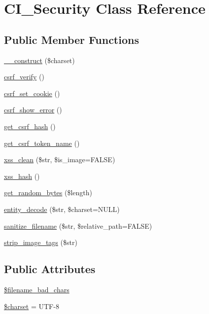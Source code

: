 \hypertarget{class_c_i___security}{}\section{C\+I\+\_\+\+Security Class Reference}
\label{class_c_i___security}
\subsection*{Public Member Functions}
\begin{DoxyCompactItemize}
\item 
\mbox{\hyperlink{class_c_i___security_aeee5dda3eeba2574642a18f281a4832c}{\+\_\+\+\_\+construct}} (\$charset)
\item 
\mbox{\hyperlink{class_c_i___security_a03c037268db0c2e6221b65a736eaee07}{csrf\+\_\+verify}} ()
\item 
\mbox{\hyperlink{class_c_i___security_a55b1380b93b71ab3d9873bb967c2b9bb}{csrf\+\_\+set\+\_\+cookie}} ()
\item 
\mbox{\hyperlink{class_c_i___security_a3d09c1dc706abfaad987661805c28a06}{csrf\+\_\+show\+\_\+error}} ()
\item 
\mbox{\hyperlink{class_c_i___security_a1644fd8967db3a1b94988d730ca34991}{get\+\_\+csrf\+\_\+hash}} ()
\item 
\mbox{\hyperlink{class_c_i___security_a00640f51b90b7d946e9d3a4f0c9f628e}{get\+\_\+csrf\+\_\+token\+\_\+name}} ()
\item 
\mbox{\hyperlink{class_c_i___security_acb759426dbab128d3d8164805225381c}{xss\+\_\+clean}} (\$str, \$is\+\_\+image=F\+A\+L\+SE)
\item 
\mbox{\hyperlink{class_c_i___security_ae2f831d3f277e1c03730b28fd1734186}{xss\+\_\+hash}} ()
\item 
\mbox{\hyperlink{class_c_i___security_a7d1d64e6798b98cb46fcdb304a4e1de2}{get\+\_\+random\+\_\+bytes}} (\$length)
\item 
\mbox{\hyperlink{class_c_i___security_a8bec9918f4d35c9e6340e1dc6a32ba14}{entity\+\_\+decode}} (\$str, \$charset=N\+U\+LL)
\item 
\mbox{\hyperlink{class_c_i___security_aaba16489285496bdc03fd12f699a08f6}{sanitize\+\_\+filename}} (\$str, \$relative\+\_\+path=F\+A\+L\+SE)
\item 
\mbox{\hyperlink{class_c_i___security_abb836a42971c7bc641588db779c6ab1d}{strip\+\_\+image\+\_\+tags}} (\$str)
\end{DoxyCompactItemize}
\subsection*{Public Attributes}
\begin{DoxyCompactItemize}
\item 
\mbox{\hyperlink{class_c_i___security_a7ea55abf18a7d5ed32df02a8144b72e2}{\$filename\+\_\+bad\+\_\+chars}}
\item 
\mbox{\hyperlink{class_c_i___security_af10158dd74b75f1d337e83102d6b82ce}{\$charset}} = \textquotesingle{}U\+TF-\/8\textquotesingle{}
\end{DoxyCompactItemize}
